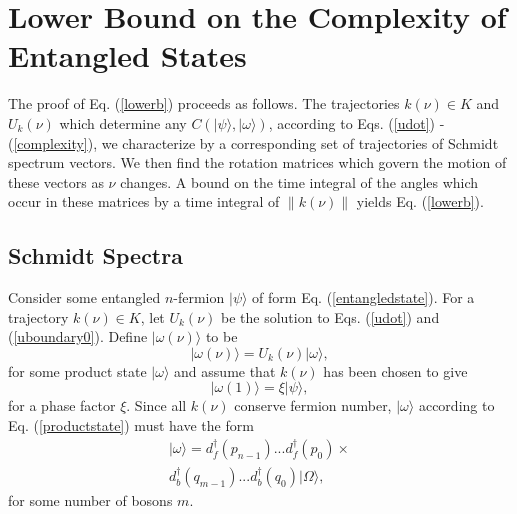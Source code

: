 \documentclass[12pt,amsmath,amssymb,onecolumn]{revtex4-2}
\begin{document}
\section{\label{app:lowerbound} Lower Bound on the Complexity of Entangled States}

The proof of Eq. (\ref{lowerb}) proceeds as follows. 
The trajectories $k(\nu) \in K$ and $U_k(\nu)$
which determine any $C( |\psi \rangle , |\omega \rangle )$, according to 
Eqs. (\ref{udot}) - (\ref{complexity}), we characterize 
by a corresponding
set of trajectories of Schmidt spectrum vectors. We then
find the rotation matrices which govern the motion of these vectors
as $\nu$ changes. A 
bound on the time integral of the angles which 
occur in these matrices by a time integral of $\parallel k(\nu) \parallel$ 
yields Eq. (\ref{lowerb}).

\subsection{\label{subsec:schmidtspectra} Schmidt Spectra}

Consider some entangled $n$-fermion $|\psi \rangle $ of form Eq. (\ref{entangledstate}).
For a trajectory $k(\nu) \in K$, let $U_k(\nu)$ be the solution to Eqs. (\ref{udot}) and (\ref{uboundary0}).
Define $|\omega(\nu) \rangle $ to be 
\begin{equation}
\label{omegaoft}
|\omega( \nu) \rangle  = U_k(\nu)|\omega \rangle ,
\end{equation}
for some product state $|\omega \rangle $
and assume that $k(\nu)$ has been chosen
to give
\begin{equation}
\label{upsiphi1}
|\omega(1) \rangle  = \xi |\psi \rangle , 
\end{equation}
for a phase factor $\xi$.
Since all $k(\nu)$ conserve fermion number, $|\omega \rangle $ according to
Eq. (\ref{productstate}) must have the form
\begin{multline}
\label{productstate1}
|\omega \rangle  = 
d_f^\dagger( p_{n-1}) ... d_f^\dagger( p_0) \times \\
d_b^\dagger( q_{m-1}) ... d_b^\dagger( q_0) |\Omega \rangle ,
\end{multline}
for some number of bosons $m$.
\end{document}
